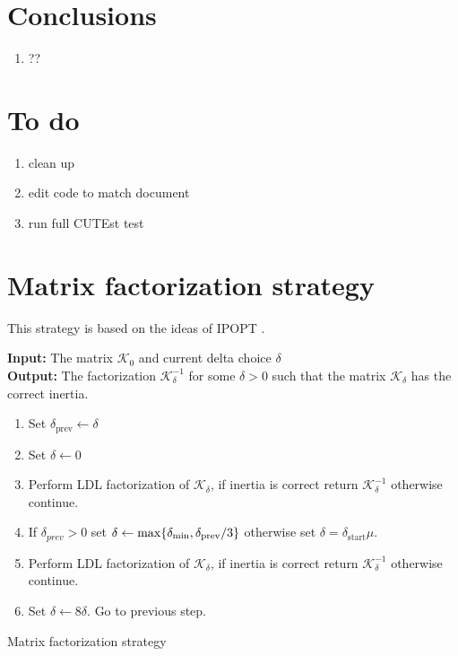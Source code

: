 \documentclass{article}
\begin{document}
\section{Conclusions}
\begin{enumerate}
\item ??
\end{enumerate}


\section{To do}

\begin{enumerate}
\item clean up 
\item edit code to match document
\item run full CUTEst test
\end{enumerate}





\appendix

\section{Matrix factorization strategy}

This strategy is based on the ideas of IPOPT \cite[Algorithm IC]{wachter2006implementation}.

\begin{algorithm}[H]
\textbf{Input:} The matrix $\mathcal{K}_{0}$ and current delta choice $\delta$ \\
\textbf{Output:} The factorization $\mathcal{K}_{\delta}^{-1}$ for some $\delta > 0$ such that the matrix $\mathcal{K}_{\delta}$ has the correct inertia.
\begin{enumerate}[label*=A.{\arabic*}]
\item Set $\delta_{\text{prev}} \gets \delta$
\item Set $\delta \gets 0$
\item Perform LDL factorization of $\mathcal{K}_{\delta}$, if inertia is correct return $\mathcal{K}_{\delta}^{-1}$ otherwise continue.
\item If $\delta_{prev} > 0$ set $\delta \gets \max\{ \delta_{\min}, \delta_{\text{prev}} / 3 \}$ otherwise set $\delta = \delta_{\text{start}} \mu$.
\item Perform LDL factorization of $\mathcal{K}_{\delta}$, if inertia is correct return $\mathcal{K}_{\delta}^{-1}$ otherwise continue.
\item Set $\delta \gets 8 \delta$. Go to previous step.
\end{enumerate}
\caption{Matrix factorization strategy}\label{alg:mat-fact}
\end{algorithm}
\end{document}
